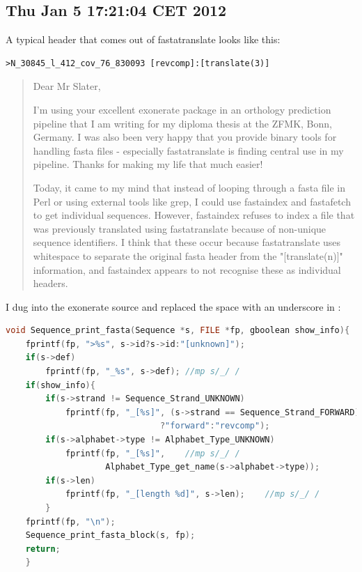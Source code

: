 \subsection*{Thu Jan  5 17:21:04 CET 2012}
A typical header that comes out of fastatranslate looks like this:
\begin{verbatim}
>N_30845_l_412_cov_76_830093 [revcomp]:[translate(3)]
\end{verbatim}
\begin{quote}
Dear Mr Slater,

I'm using your excellent exonerate package in an orthology prediction pipeline
that I am writing for my diploma thesis at the ZFMK, Bonn, Germany. I was also
been very happy that you provide binary tools for handling fasta files -
especially fastatranslate is finding central use in my pipeline. Thanks for
making my life that much easier!

Today, it came to my mind that instead of looping through a fasta file in Perl
or using external tools like grep, I could use fastaindex and fastafetch to get
individual sequences. However, fastaindex refuses to index a file that was
previously translated using fastatranslate because of non-unique sequence
identifiers. I think that these occur because fastatranslate uses whitespace to
separate the original fasta header from the "[translate(n)]" information, and
fastaindex appears to not recognise these as individual headers.  
\end{quote}

I dug into the exonerate source and replaced the space with an underscore in
:

\begin{lstlisting}[language=c,caption=src/sequence/sequence.c]
void Sequence_print_fasta(Sequence *s, FILE *fp, gboolean show_info){
    fprintf(fp, ">%s", s->id?s->id:"[unknown]");
    if(s->def)
        fprintf(fp, "_%s", s->def);	//mp s/_/ /
    if(show_info){
        if(s->strand != Sequence_Strand_UNKNOWN)
            fprintf(fp, "_[%s]", (s->strand == Sequence_Strand_FORWARD)	//mp s/_/ /
                               ?"forward":"revcomp");
        if(s->alphabet->type != Alphabet_Type_UNKNOWN)
            fprintf(fp, "_[%s]",	//mp s/_/ /
                    Alphabet_Type_get_name(s->alphabet->type));
        if(s->len)
            fprintf(fp, "_[length %d]", s->len);	//mp s/_/ /
        }
    fprintf(fp, "\n");
    Sequence_print_fasta_block(s, fp);
    return;
    }
\end{lstlisting}

